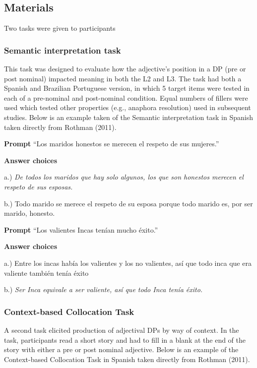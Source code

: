 \documentclass[
  man]{apa6}
\begin{document}
\hypertarget{materials}{%
\subsection{Materials}\label{materials}}

Two tasks were given to participants

\hypertarget{semantic-interpretation-task}{%
\subsubsection{Semantic interpretation task}\label{semantic-interpretation-task}}

This task was designed to evaluate how the adjective's position in a DP (pre or post nominal) impacted meaning in both the L2 and L3.
The task had both a Spanish and Brazilian Portuguese version, in which 5 target items were tested in each of a pre-nominal and post-nominal condition.
Equal numbers of fillers were used which tested other properties (e.g., anaphora resolution) used in subsequent studies.
Below is an example taken of the Semantic interpretation task in Spanish taken directly from Rothman (2011).

\textbf{Prompt}
``Los maridos honestos se merecen el respeto de sus mujeres.''

\textbf{Answer choices}

a.) \emph{De todos los maridos que hay solo algunos, los que son honestos merecen el respeto de sus esposas.}

b.) Todo marido se merece el respeto de su esposa porque todo marido es, por ser marido, honesto.

\textbf{Prompt}
``Los valientes Incas tenían mucho éxito.''

\textbf{Answer choices}

a.) Entre los incas había los valientes y los no valientes, así que todo inca que era valiente también tenía éxito

b.) \emph{Ser Inca equivale a ser valiente, así que todo Inca tenía éxito.}

\hypertarget{context-based-collocation-task}{%
\subsubsection{Context-based Collocation Task}\label{context-based-collocation-task}}

A second task elicited production of adjectival DPs by way of context.
In the task, participants read a short story and had to fill in a blank at the end of the story with either a pre or post nominal adjective.
Below is an example of the Context-based Collocation Task in Spanish taken directly from Rothman (2011).
\end{document}
